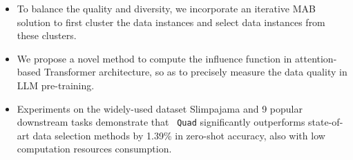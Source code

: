 \documentclass{article} %
\begin{document}
\begin{itemize}

\item To balance the quality and diversity, we incorporate an iterative MAB solution to first cluster the data instances and select data instances from these clusters.

\item We propose a novel method to compute the influence function in attention-based Transformer architecture, so as to precisely measure the data quality in LLM pre-training.

\item Experiments on the widely-used dataset Slimpajama and 9 popular downstream tasks demonstrate that ~\texttt{Quad} significantly outperforms state-of-art data selection methods by 1.39\% in zero-shot accuracy, also with low computation resources consumption. 

\end{itemize}







\end{document}
